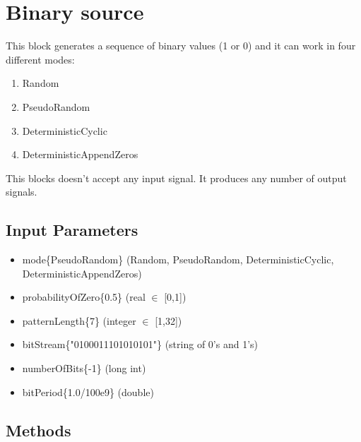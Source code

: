 \clearpage

\section{Binary source}

\maketitle
This block generates a sequence of binary values (1 or 0) and it can work in four different modes: 

\begin{multicols}{2}
\begin{enumerate}
	\item Random
	\item PseudoRandom 
	\item DeterministicCyclic 
	\item DeterministicAppendZeros 
\end{enumerate}
\end{multicols}

This blocks doesn't accept any input signal. It produces any number of output signals.

\subsection*{Input Parameters}

	\begin{itemize}
		\item mode\{PseudoRandom\}\linebreak
		(Random, PseudoRandom, DeterministicCyclic, DeterministicAppendZeros)
		\item probabilityOfZero\{0.5\}\linebreak
		(real $\in$ [0,1])
		\item patternLength\{7\} \linebreak
		(integer $\in$ [1,32]) 
		\item bitStream\{"0100011101010101"\} \linebreak
		(string of 0's and 1's)
		\item numberOfBits\{-1\} \linebreak
		(long int)
		\item bitPeriod\{1.0/100e9\} \linebreak
		(double)
	\end{itemize}

\subsection*{Methods}


